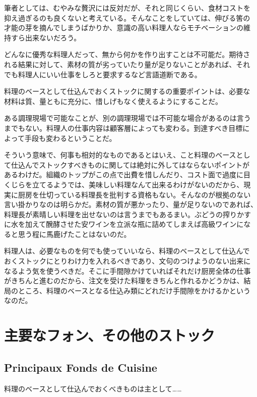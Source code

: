 \documentclass[twoside,12Q,b5j]{escoffierltjsbook}
\begin{document}
筆者としては、むやみな贅沢には反対だが、それと同じくらい、食材コストを
抑え過ぎるのも良くないと考えている。そんなことをしていては、伸びる筈の
才能の芽を摘んでしまうばかりか、意識の高い料理人ならモチベーションの維
持すら出来ないだろう。

どんなに優秀な料理人だって、無から何かを作り出すことは不可能だ。期待さ
れる結果に対して、素材の質が劣っていたり量が足りないことがあれば、それ
でも料理人にいい仕事をしろと要求するなど言語道断である。

料理のベースとして仕込んでおくストックに関するの重要ポイントは、必要な
材料は質、量ともに充分に、惜しげもなく使えるようにすることだ。

ある調理現場で可能なことが、別の調理現場では不可能な場合があるのは言う
までもない。料理人の仕事内容は顧客層によっても変わる。到達すべき目標に
よって手段も変わるということだ。

そういう意味で、何事も相対的なものであるとはいえ、こと料理のベースとし
て仕込んでストックすべきものに関しては絶対に外してはならないポイントが
あるわけだ。組織のトップがこの点で出費を惜しんだり、コスト面で過度に目
くじらを立てるようでは、美味しい料理なんて出来るわけがないのだから、現
実に厨房を仕切っている料理長を批判する資格もない。そんなのが根拠のない
言い掛かりなのは明らかだ。素材の質が悪かったり、量が足りないのであれば、
料理長が素晴しい料理を出せないのは言うまでもあるまい。ぶどうの搾りかす
に水を加えて醗酵させた安ワインを立派な瓶に詰めてしまえば高級ワインにな
ると思う程に馬鹿げたことはないのだ。

料理人は、必要なものを何でも使っていいなら、料理のベースとして仕込んで
おくストックにとりわけ力を入れるべきであり、文句のつけようのない出来に
なるよう気を使うべきだ。そこに手間隙かけていればそれだけ厨房全体の仕事
がきちんと進むのだから、注文を受けた料理をきちんと作れるかどうかは、結
局のところ、料理のベースとなる仕込み類にどれだけ手間隙をかけるかという
なのだ。

\section{主要なフォン、その他のストック}\label{principaux-fonds-de-cuisine}

\subsection{Principaux Fonds de
Cuisine}\label{principaux-fonds-de-cuisine}

料理のベースとして仕込んでおくべきものは主として\ldots{}\ldots{}
\end{document}
